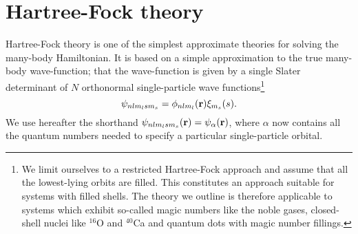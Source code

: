\section{Hartree-Fock theory}\label{sec:hf}


Hartree-Fock theory \cite{helgaker,bransden1983}
is one of the simplest approximate theories  
for solving the many-body Hamiltonian. It is based on a simple
approximation to the true many-body wave-function; that the
wave-function is given by a single Slater determinant of $N$ 
orthonormal single-particle wave functions\footnote{We limit ourselves to a restricted 
Hartree-Fock approach and assume that all the lowest-lying orbits are filled. This constitutes 
an approach suitable for systems with filled shells. 
The theory we outline is therefore applicable to systems which 
exhibit so-called magic numbers like the noble gases, closed-shell nuclei  
like $^{16}$O and $^{40}$Ca and quantum dots with magic number fillings.}
\[
  \psi_{nlm_lsm_s} = \phi_{nlm_l}({\bf r})\xi_{m_s}(s).
\]
We use hereafter the shorthand $\psi_{nlm_lsm_s}({\bf r}) = \psi_{\alpha}({\bf r})$,
where $\alpha$ now contains all the quantum numbers  needed to specify a particular single-particle orbital.

